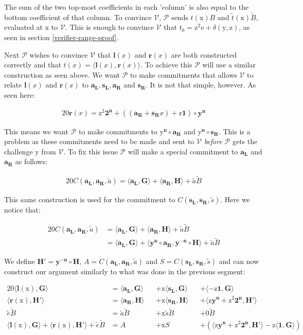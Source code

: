 \documentclass{article}
\newcommand{\eq}[1]{\begin{alignat*}{20}#1\end{alignat*}}
\renewcommand{\vec}[1]{\boldsymbol{#1}}
\newcommand{\ran}[1]{\mathrm{#1}}
\newcommand{\vecran}[1]{\mathbf{#1}}
\newcommand{\V}{\mathcal{V}}
\renewcommand{\P}{\mathcal{P}}
\newcommand{\dotp}[2]{\langle #1, #2 \rangle}
\newcommand{\opn}[1]{\operatorname{#1}}
\newcommand{\vecl}[1]{\vec{#1_{\opn{L}}}}
\newcommand{\vecr}[1]{\vec{#1_{\opn{R}}}}
\newcommand{\blind}[1]{\widetilde{#1}}
\newcommand{\bt}{\blind{t}}
\newcommand{\ba}{\blind{a}}
\newcommand{\bB}{\blind{B}}
\newcommand{\be}{\blind{e}}
\newcommand{\bs}{\blind{s}}
\begin{document}
The sum of the two top-most coefficients in each 'column' is also
equal to the bottom coefficient of that column. To convince $\V$, $\P$
sends $t(\ran{x})B$ and $\bt(\ran{x})\bB$, evaluated at $\ran{x}$
to $\V$. This is enough to convince $\V$ that $t_0 = \ran{z^2}v +
\delta(\ran{y},\ran{z})$, as seen in section \ref{verifier-range-proof}.

Next $\P$ wishes to convince $\V$ that $\vec{l}(x)$ and
$\vec{r}(x)$ are both constructed correctly and that $t(x) =
\dotp{\vec{l}(x)}{\vec{r}(x)}$. To achieve this $\P$ will use a similar
construction as seen above. We want $\P$ to make commitments that allows
$\V$ to relate $\vec{l}(x)$ and $\vec{r}(x)$ to $\vecl{a}, \vecl{s},
\vecr{a}$ and $\vecr{s}$. It is not that simple, however. As seen here:

\eq{
	\vec{r}(x) = \ran{z^2}\vec{2^n} + ((\vecr{a} + \vecr{s}x) + \ran{z}\vec{1})\circ\vecran{y}^{\vec{n}}
}

This means we want $\P$ to make commitments to $\vec{\ran{y}^n}\circ
\vecr{a}$ and $\vec{\ran{y}^n}\circ\vecr{s}$. This is a problem as these
commitments need to be made and sent to $\V$ \textit{before} $\P$
gets the challenge $\ran{y}$ from $\V$. To fix this issue $\P$ will
make a special commitment to $\vecl{a}$ and $\vecr{a}$ as follows:

\eq{
	C(\vecl{a}, \vecr{a}, \ba) = \dotp{\vecl{a}}{\vec{G}} + \dotp{\vecr{a}}{\vec{H}} + \ba\bB
}

This same construction is used for the commitment to $C(\vecl{s},
\vecr{s}, \bs)$. Here we notice that:

\eq{
	C(\vecl{a}, \vecr{a}, \ba) &= \dotp{\vecl{a}}{\vec{G}} + \dotp{\vecr{a}}{\vec{H}} + \ba\bB \\
	&= \dotp{\vecl{a}}{\vec{G}} + \dotp{\vecran{y}^{\vec{n}}\circ \vecr{a}}{\vecran{y^{-n}}\circ \vec{H}} + \ba\bB
}

We define $\vec{H'} = \vecran{y^{-n}}\circ\vec{H}$, $A =
C(\vecl{a},\vecr{a}, \ba)$ and $S = C(\vecl{s}, \vecr{s},
\bs)$ and can now construct our argument similarly to what
was done in the previous segment:

\eq{
	\dotp{\vec{l}(\ran{x})}{\vec{G}} &= \dotp{\vecl{a}}{\vec{G}} &&+ \ran{x}\dotp{\vecl{s}}{\vec{G}} &&+ \dotp{-\ran{z}\vec{1}}{\vec{G}} \\
	\dotp{\vec{r}(\ran{x})}{\vec{H'}} &= \dotp{\vecr{a}}{\vec{H}} &&+ \ran{x}\dotp{\vecr{s}}{\vec{H}} &&+ \dotp{\ran{z}\vecran{y}^{\vec{n}} + \ran{z^2}\vec{2^n}}{\vec{H'}}\\
	\be\bB &= \ba\bB &&+ \ran{x}\bs\bB &&+ 0 \bB \\
	\dotp{\vec{l}(\ran{x})}{\vec{G}} + \dotp{\vec{r}(\ran{x})}{\vec{H'}} + \be\bB &= A &&+ \ran{x}S &&+ (\dotp{\ran{z}\vecran{y}^{\vec{n}} + \ran{z^2}\vec{2^n}}{\vec{H'}} - \ran{z}\dotp{\vec{1}}{\vec{G}})
}
\end{document}
